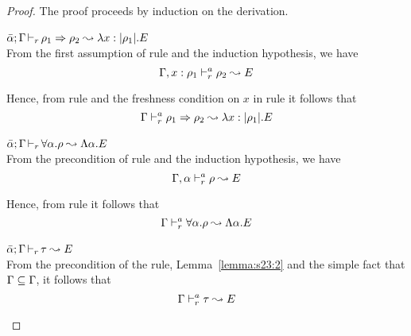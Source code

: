\begin{proof}
The proof proceeds by induction on the derivation.
\begin{description}
\setlength{\itemsep}{1em}
\item[\fbox{\texttt{(R-IAbs)}}]\quad$\bar{\alpha};\Gamma \mathop{\vdash_{r}} \rho_1 \Rightarrow \rho_2 \leadsto \lambda x:|\rho_1|.E$ \ \\
  From the first assumption of rule  and the induction hypothesis, we have
\begin{equation*}
  \Gamma, x : \rho_1 \vdash^a_{r} \rho_2 \leadsto E
\end{equation*}

  Hence, from rule  and the freshness condition on $x$ in
rule  it follows that
\begin{equation*}
  \Gamma \vdash^a_{r} \rho_1 \Rightarrow \rho_2 \leadsto \lambda x:|\rho_1|.E
\end{equation*}

\item[\fbox{\texttt{(R-TAbs)}}]\quad$\bar{\alpha};\Gamma \mathop{\vdash_{r}} \forall \alpha.\rho \leadsto \Lambda \alpha.E$ \ \\
  From the precondition of rule  and the induction hypothesis, we have
\begin{equation*}
  \Gamma,\alpha \vdash^a_{r} \rho \leadsto E
\end{equation*}

  Hence, from rule  it follows that
\begin{equation*}
  \Gamma \vdash^a_{r} \forall \alpha.\rho \leadsto \Lambda \alpha.E
\end{equation*}

\item[\fbox{\texttt{(R-Simp)}}]\quad$\bar{\alpha};\Gamma \mathop{\vdash_{r}} \tau \leadsto E$ \ \\

  From the precondition of the rule, Lemma~\ref{lemma:s23:2} and the simple fact that
  $\Gamma \subseteq \Gamma$, it follows that
\begin{equation*}
  \Gamma \vdash^a_{r} \tau \leadsto E
\end{equation*}
\end{description}
\end{proof}


